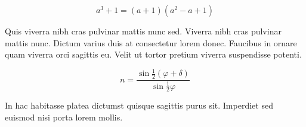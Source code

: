 \documentclass{article}
\begin{document}
    \begin{displaymath}
    	a^{3}+1=(a+1)(a^{2}-a+1)
    \end{displaymath}
    
    Quis viverra nibh cras pulvinar mattis nunc sed. Viverra nibh cras pulvinar mattis nunc. Dictum varius duis at consectetur lorem donec. Faucibus in ornare quam viverra orci sagittis eu. Velit ut tortor pretium viverra suspendisse potenti.
    
    
    
    \begin{equation}
	    n=\frac{\sin \frac{1}{2}(\varphi +\delta)}{\sin \frac{1}{2}\varphi}
    \end{equation}
    
    In hac habitasse platea dictumst quisque sagittis purus sit. Imperdiet sed euismod nisi porta lorem mollis. 
    
\end{document}
